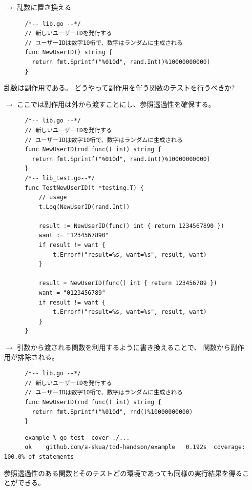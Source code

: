 \documentclass[aspectratio=169]{beamer}
\begin{document}
\begin{frame}[fragile]
  $\rightarrow$
  乱数に置き換える
  {
    \scriptsize
    \begin{verbatim}
      /*-- lib.go --*/
      // 新しいユーザーIDを発行する
      // ユーザーIDは数字10桁で、数字はランダムに生成される
      func NewUserID() string {
        return fmt.Sprintf("%010d", rand.Int()%10000000000)
      }

    \end{verbatim}
  }
  乱数は副作用である。
  どうやって副作用を伴う関数のテストを行うべきか?
\end{frame}

\begin{frame}[fragile]
  $\rightarrow$
  ここでは副作用は外から渡すことにし、参照透過性を確保する。
  {
    \scriptsize
    \begin{verbatim}
      /*-- lib.go --*/
      // 新しいユーザーIDを発行する
      // ユーザーIDは数字10桁で、数字はランダムに生成される
      func NewUserID(rnd func() int) string {
        return fmt.Sprintf("%010d", rand.Int()%10000000000)
      }
      /*-- lib_test.go--*/
      func TestNewUserID(t *testing.T) {
          // usage
          t.Log(NewUserID(rand.Int))

          result := NewUserID(func() int { return 1234567890 })
          want := "1234567890"
          if result != want {
              t.Errorf("result=%s, want=%s", result, want)
          }

          result = NewUserID(func() int { return 123456789 })
          want = "0123456789"
          if result != want {
              t.Errorf("result=%s, want=%s", result, want)
          }
      }
    \end{verbatim}
  }
\end{frame}

\begin{frame}[fragile]
  $\rightarrow$
  引数から渡される関数を利用するように書き換えることで、
  関数から副作用が排除される。
  {
    \scriptsize
    \begin{verbatim}
      /*-- lib.go --*/
      // 新しいユーザーIDを発行する
      // ユーザーIDは数字10桁で、数字はランダムに生成される
      func NewUserID(rnd func() int) string {
        return fmt.Sprintf("%010d", rnd()%10000000000)
      }
    \end{verbatim}
  }
  {
    \color{gray}
    \scriptsize
    \begin{verbatim}
      example % go test -cover ./...
      ok  	github.com/a-skua/tdd-handson/example	0.192s	coverage: 100.0% of statements
    \end{verbatim}
  }

  参照透過性のある関数とそのテストどの環境であっても同様の実行結果を得ることができる。
\end{frame}
\end{document}
